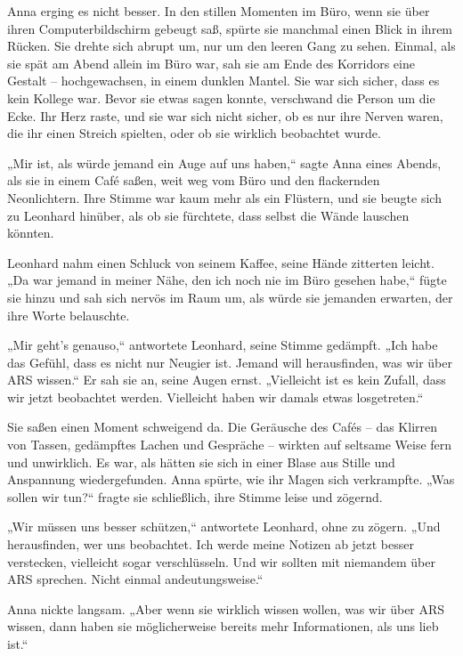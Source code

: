 \documentclass[
]{article}
\begin{document}
Anna erging es nicht besser. In den stillen Momenten im Büro, wenn sie
über ihren Computerbildschirm gebeugt saß, spürte sie manchmal einen
Blick in ihrem Rücken. Sie drehte sich abrupt um, nur um den leeren Gang
zu sehen. Einmal, als sie spät am Abend allein im Büro war, sah sie am
Ende des Korridors eine Gestalt -- hochgewachsen, in einem dunklen
Mantel. Sie war sich sicher, dass es kein Kollege war. Bevor sie etwas
sagen konnte, verschwand die Person um die Ecke. Ihr Herz raste, und sie
war sich nicht sicher, ob es nur ihre Nerven waren, die ihr einen
Streich spielten, oder ob sie wirklich beobachtet wurde.

„Mir ist, als würde jemand ein Auge auf uns haben,`` sagte Anna eines
Abends, als sie in einem Café saßen, weit weg vom Büro und den
flackernden Neonlichtern. Ihre Stimme war kaum mehr als ein Flüstern,
und sie beugte sich zu Leonhard hinüber, als ob sie fürchtete, dass
selbst die Wände lauschen könnten.

Leonhard nahm einen Schluck von seinem Kaffee, seine Hände zitterten
leicht. „Da war jemand in meiner Nähe, den ich noch nie im Büro gesehen
habe,`` fügte sie hinzu und sah sich nervös im Raum um, als würde sie
jemanden erwarten, der ihre Worte belauschte.

„Mir geht's genauso,`` antwortete Leonhard, seine Stimme gedämpft. „Ich
habe das Gefühl, dass es nicht nur Neugier ist. Jemand will
herausfinden, was wir über ARS wissen.`` Er sah sie an, seine Augen
ernst. „Vielleicht ist es kein Zufall, dass wir jetzt beobachtet werden.
Vielleicht haben wir damals etwas losgetreten.``

Sie saßen einen Moment schweigend da. Die Geräusche des Cafés -- das
Klirren von Tassen, gedämpftes Lachen und Gespräche -- wirkten auf
seltsame Weise fern und unwirklich. Es war, als hätten sie sich in einer
Blase aus Stille und Anspannung wiedergefunden. Anna spürte, wie ihr
Magen sich verkrampfte. „Was sollen wir tun?{\kern0pt}`` fragte sie
schließlich, ihre Stimme leise und zögernd.

„Wir müssen uns besser schützen,`` antwortete Leonhard, ohne zu zögern.
„Und herausfinden, wer uns beobachtet. Ich werde meine Notizen ab jetzt
besser verstecken, vielleicht sogar verschlüsseln. Und wir sollten mit
niemandem über ARS sprechen. Nicht einmal andeutungsweise.``

Anna nickte langsam. „Aber wenn sie wirklich wissen wollen, was wir über
ARS wissen, dann haben sie möglicherweise bereits mehr Informationen,
als uns lieb ist.``
\end{document}
